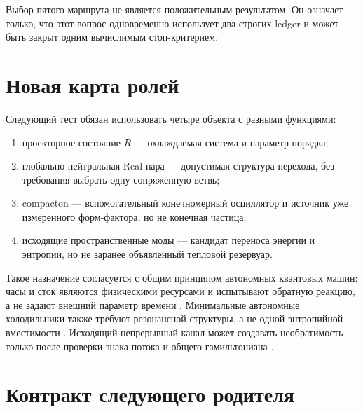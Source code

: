 Выбор пятого маршрута не является положительным результатом. Он означает
только, что этот вопрос одновременно использует два строгих ledger и
может быть закрыт одним вычислимым стоп-критерием.

\section{Новая карта ролей}

Следующий тест обязан использовать четыре объекта с разными функциями:
\begin{enumerate}\raggedright
 \item проекторное состояние $R$ --- охлаждаемая система и параметр
 порядка;
 \item глобально нейтральная Real-пара --- допустимая структура перехода,
 без требования выбрать одну сопряжённую ветвь;
 \item compacton --- вспомогательный конечномерный осциллятор и источник
 уже измеренного форм-фактора, но не конечная частица;
 \item исходящие пространственные моды --- кандидат переноса энергии и
 энтропии, но не заранее объявленный тепловой резервуар.
\end{enumerate}

Такое назначение согласуется с общим принципом автономных квантовых машин:
часы и сток являются физическими ресурсами и испытывают обратную реакцию,
а не задают внешний параметр времени \cite{post-compacton-erker2017}.
Минимальные автономные холодильники также требуют резонансной структуры,
а не одной энтропийной вместимости
\cite{post-compacton-linden2010}. Исходящий непрерывный канал может
создавать необратимость только после проверки знака потока и общего
гамильтониана \cite{post-compacton-fano1961}.

\section{Контракт следующего родителя}

